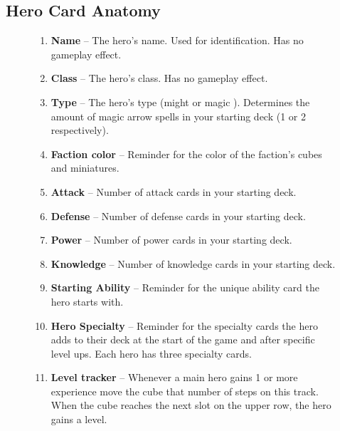 \clearpage

\subsection*{\hypertarget{Herocard}{Hero Card Anatomy}}
\bigbreak
\begin{figure}[h]
  \begin{minipage}[t]{0.5\textwidth}
    \vspace{0pt}
    \begin{enumerate}[itemsep=5pt]
      \item \textbf{Name} – The hero’s name.
        Used for identification.
        Has no gameplay effect.
      \item \textbf{Class} – The hero’s class.
        Has no gameplay effect.
      \item \textbf{Type} – The hero’s type (might  or magic ).
        Determines the amount of magic arrow spells in your starting deck (1 or 2 respectively).
      \item \textbf{Faction color} – Reminder for the color of the faction’s cubes and miniatures.
      \item \textbf{Attack} – Number of attack cards in your starting deck.
      \item \textbf{Defense} – Number of defense cards in your starting deck.
      \item \textbf{Power} – Number of power cards in your starting deck.
      \item \textbf{Knowledge} – Number of knowledge cards in your starting deck.
      \item \textbf{Starting Ability} – Reminder for the unique ability card the hero starts with.
      \item \textbf{Hero Specialty} – Reminder for the specialty cards the hero adds to their deck at the start of the game and after specific level ups.
        Each hero has three specialty cards.
      \item \textbf{Level tracker} – Whenever a main hero gains 1 or more experience  move the cube that number of steps on this track.
        When the cube reaches the next slot on the upper row, the hero gains a level.
    \end{enumerate}
  \end{minipage}\hfill
  \begin{minipage}[t]{0.48\textwidth}
    \centering

\end{minipage}
\end{figure}
